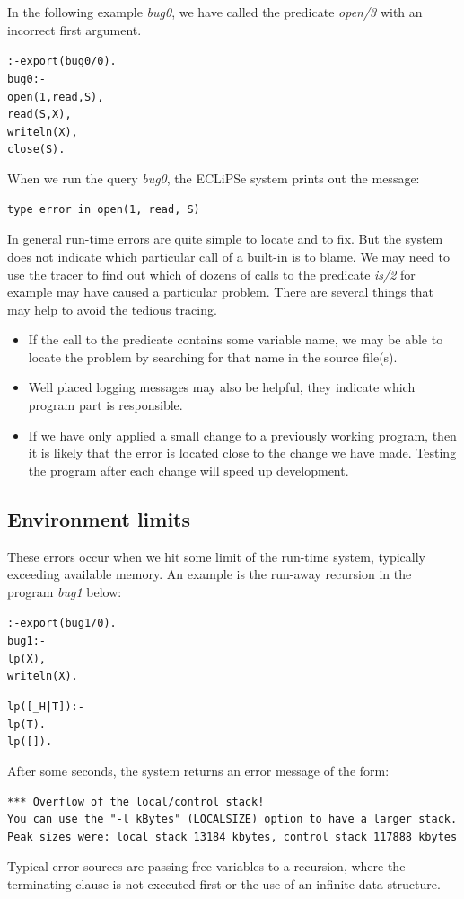 \documentclass[a4paper,12pt]{report}
\begin{document}
In the following example {\it bug0}, we have called the predicate {\it open/3} with an incorrect first argument.
\pagebreak
\begin{alltt}
:-export(bug0/0).
bug0:-
        open(1,read,S), %
        read(S,X),
        writeln(X),
        close(S).
\end{alltt}

When we run the query {\it bug0}, the ECLiPSe system prints out the message:
\begin{verbatim}
type error in open(1, read, S)
\end{verbatim}
In general run-time errors are quite simple to locate and to fix. But the system does not indicate which particular call of a built-in is to blame. We may need to use the tracer to find out which of dozens of calls to the predicate {\it is/2} for example may have caused a particular problem. There are several things that may help to avoid the tedious tracing. 
\begin{itemize}
\item If the call to the predicate contains some variable name, we may be able to locate the problem by searching for that name in the source file(s). 
\item Well placed logging messages may also be helpful, they indicate which program part is responsible.
\item If we have only applied a small change to a previously working program, then it is likely that the error is located close to the change we have made. Testing the program after each change will speed up development.
\end{itemize} 

\subsection{Environment limits} 
These errors occur when we hit some limit of the run-time system, typically exceeding available memory. An example is the run-away recursion in the program {\it bug1} below:

\begin{alltt}
:-export(bug1/0).
bug1:-
        lp(X),  %
        writeln(X).

lp([_H|T]):-
        lp(T).
lp([]).
\end{alltt}

After some seconds, the system returns an error message of the form:
\begin{footnotesize}
\begin{verbatim}
*** Overflow of the local/control stack!
You can use the "-l kBytes" (LOCALSIZE) option to have a larger stack.
Peak sizes were: local stack 13184 kbytes, control stack 117888 kbytes
\end{verbatim}
\end{footnotesize}
Typical error sources are passing free variables to a recursion, where the terminating clause is not executed first or the use of an infinite data structure.
\end{document}
